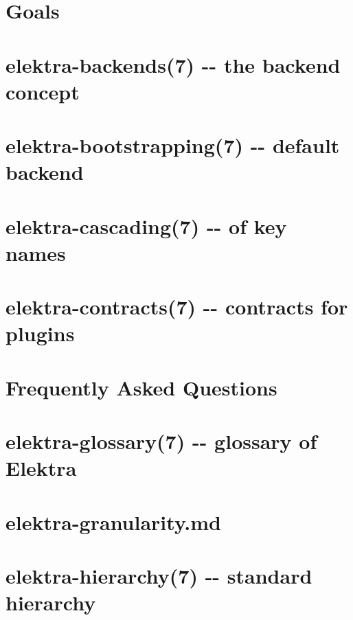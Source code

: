 \documentclass[twoside]{book}
\newcommand{\+}{\discretionary{\mbox{\scriptsize$\hookleftarrow$}}{}{}}
\begin{document}
\chapter{Goals}
\label{doc_GOALS_md}

\chapter{elektra-\/backends(7) -\/-\/ the backend concept}
\label{md_doc_help_elektra-backends}

\chapter{elektra-\/bootstrapping(7) -\/-\/ default backend}
\label{md_doc_help_elektra-bootstrapping}

\chapter{elektra-\/cascading(7) -\/-\/ of key names}
\label{md_doc_help_elektra-cascading}

\chapter{elektra-\/contracts(7) -\/-\/ contracts for plugins}
\label{md_doc_help_elektra-contracts}

\chapter{Frequently Asked Questions}
\label{doc_help_elektra-faq_md}

\chapter{elektra-\/glossary(7) -\/-\/ glossary of Elektra}
\label{md_doc_help_elektra-glossary}

\chapter{elektra-\/granularity.md}
\label{doc_help_elektra-granularity_md}

\chapter{elektra-\/hierarchy(7) -\/-\/ standard hierarchy}
\label{md_doc_help_elektra-hierarchy}

\end{document}
